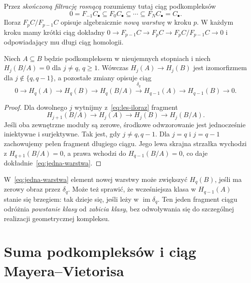 \begin{definicja}
\label{def:filtracja-kompleksu}
Przez \emph{skończoną filtrację rosnącą} rozumiemy tutaj ciąg
podkompleksów
\[
 0=F_{-1}C_\bullet\subseteq
 F_0C_\bullet\subseteq\cdots\subseteq
 F_NC_\bullet=C_\bullet.
\]
Iloraz $F_pC/F_{p-1}C$ opisuje
algebraicznie \emph{nową warstwę}
w kroku $p$. W każdym kroku mamy
krótki ciąg dokładny
$0\to F_{p-1}C\to F_pC\to
F_pC/F_{p-1}C\to0$
i odpowiadający mu długi ciąg homologii.
\end{definicja}

\begin{wniosek}
\label{wn:filtracja-jeden-stopien}
Niech $A\subseteq B$ będzie podkompleksem
w nieujemnych stopniach i niech
$H_j(B/A)=0$ dla $j\ne q$, $q\geq1$.
Wówczas $H_j(A)\to H_j(B)$ jest
izomorfizmem dla $j\notin\{q,q-1\}$,
a pozostałe zmiany opisuje ciąg
\begin{equation}\label{eq:jedna-warstwa}
 0\to H_q(A)\to H_q(B)\to H_q(B/A)
 \xrightarrow{\delta_q}H_{q-1}(A)
 \to H_{q-1}(B)\to0.
\end{equation}
\end{wniosek}
\begin{proof}
Dla dowolnego $j$ wytnijmy z~\eqref{eq:les-iloraz}
fragment
\[
 H_{j+1}(B/A)\to H_j(A)\to H_j(B)\to H_j(B/A).
\]
Jeśli oba zewnętrzne moduły są zerowe,
środkowe odwzorowanie jest jednocześnie
iniektywne i surjektywne.
Tak jest, gdy $j\ne q,q-1$.
Dla $j=q$ i $j=q-1$ zachowujemy
pełen fragment długiego ciągu.
Jego lewa skrajna strzałka wychodzi
z $H_{q+1}(B/A)=0$, a prawa
wchodzi do $H_{q-1}(B/A)=0$,
co daje dokładnie~\eqref{eq:jedna-warstwa}.
\end{proof}

\begin{uwaga}
W~\eqref{eq:jedna-warstwa} element
nowej warstwy może zwiększyć
$H_q(B)$, jeśli ma zerowy obraz
przez $\delta_q$. Może też sprawić,
że wcześniejsza klasa w
$H_{q-1}(A)$ stanie się brzegiem:
tak dzieje się, jeśli leży w
$\operatorname{im}\delta_q$.
Ten jeden fragment ciągu odróżnia
\emph{powstanie klasy} od
\emph{zabicia klasy}, bez odwoływania
się do szczególnej realizacji
geometrycznej kompleksu.
\end{uwaga}
\section{Suma podkompleksów i ciąg Mayera--Vietorisa}
\label{sec:mv-algebraiczny}

